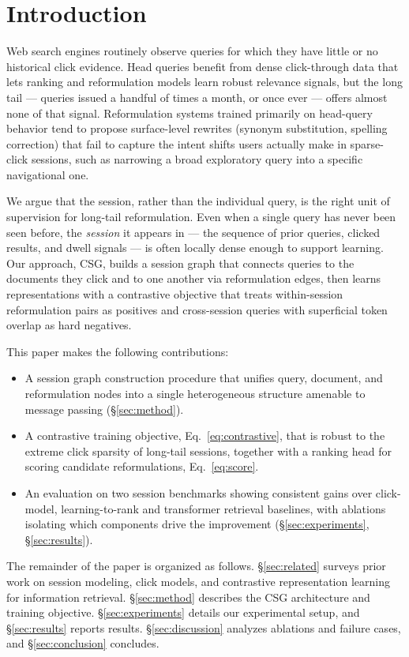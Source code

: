 \section{Introduction}

Web search engines routinely observe queries for which they have little or no
historical click evidence. Head queries benefit from dense click-through data that
lets ranking and reformulation models learn robust relevance signals, but the long
tail --- queries issued a handful of times a month, or once ever --- offers almost
none of that signal. Reformulation systems trained primarily on head-query behavior
tend to propose surface-level rewrites (synonym substitution, spelling correction)
that fail to capture the intent shifts users actually make in sparse-click sessions,
such as narrowing a broad exploratory query into a specific navigational one.

We argue that the session, rather than the individual query, is the right unit of
supervision for long-tail reformulation. Even when a single query has never been seen
before, the \emph{session} it appears in --- the sequence of prior queries, clicked
results, and dwell signals --- is often locally dense enough to support learning. Our
approach, CSG, builds a session graph that connects queries to the documents they
click and to one another via reformulation edges, then learns representations with a
contrastive objective that treats within-session reformulation pairs as positives and
cross-session queries with superficial token overlap as hard negatives.

This paper makes the following contributions:

\begin{itemize}
  \item A session graph construction procedure that unifies query, document, and
    reformulation nodes into a single heterogeneous structure amenable to message
    passing (\S\ref{sec:method}).
  \item A contrastive training objective, Eq.~\eqref{eq:contrastive}, that is robust
    to the extreme click sparsity of long-tail sessions, together with a ranking head
    for scoring candidate reformulations, Eq.~\eqref{eq:score}.
  \item An evaluation on two session benchmarks showing consistent gains over
    click-model, learning-to-rank and transformer retrieval baselines, with ablations
    isolating which components drive the improvement (\S\ref{sec:experiments},
    \S\ref{sec:results}).
\end{itemize}

The remainder of the paper is organized as follows. \S\ref{sec:related} surveys prior
work on session modeling, click models, and contrastive representation learning for
information retrieval. \S\ref{sec:method} describes the CSG architecture and training
objective. \S\ref{sec:experiments} details our experimental setup, and
\S\ref{sec:results} reports results. \S\ref{sec:discussion} analyzes ablations and
failure cases, and \S\ref{sec:conclusion} concludes.
